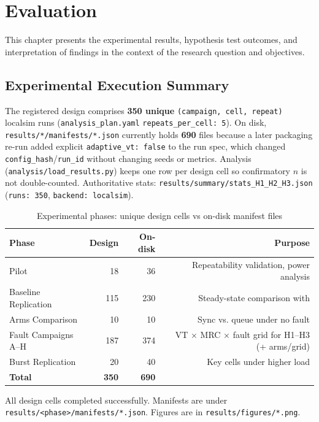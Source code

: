 \chapter{Evaluation}

This chapter presents the experimental results, hypothesis test outcomes, and interpretation of findings in the context of the research question and objectives.

\section{Experimental Execution Summary}

The registered design comprises \textbf{350 unique} \texttt{(campaign, cell, repeat)} localsim runs (\texttt{analysis\_plan.yaml} \texttt{repeats\_per\_cell: 5}). On disk, \texttt{results/*/manifests/*.json} currently holds \textbf{690} files because a later packaging re-run added explicit \texttt{adaptive\_vt: false} to the run spec, which changed \texttt{config\_hash}/\texttt{run\_id} without changing seeds or metrics. Analysis (\texttt{analysis/load\_results.py}) keeps one row per design cell so confirmatory $n$ is not double-counted. Authoritative stats: \texttt{results/summary/stats\_H1\_H2\_H3.json} (\texttt{runs: 350}, \texttt{backend: localsim}).

\begin{table}[h]
\centering
\begin{tabular}{lrrr}
\hline
\textbf{Phase} & \textbf{Design} & \textbf{On-disk} & \textbf{Purpose} \\
\hline
Pilot & 18 & 36 & Repeatability validation, power analysis \\
Baseline Replication & 115 & 230 & Steady-state comparison with \citet{Kyrychenko2025} \\
Arms Comparison & 10 & 10 & Sync vs. queue under no fault \\
Fault Campaigns A--H & 187 & 374 & VT × MRC × fault grid for H1--H3 (+ arms/grid) \\
Burst Replication & 20 & 40 & Key cells under higher load \\
\hline
\textbf{Total} & \textbf{350} & \textbf{690} & \\
\hline
\end{tabular}
\caption{Experimental phases: unique design cells vs on-disk manifest files}
\end{table}

All design cells completed successfully. Manifests are under \texttt{results/<phase>/manifests/*.json}. Figures are in \texttt{results/figures/*.png}.

